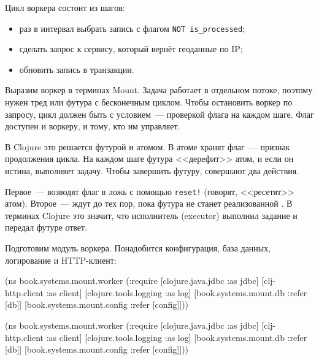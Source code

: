 
Цикл воркера состоит из шагов:

\begin{itemize}

\item
  раз в интервал выбрать запись с флагом \verb|NOT is_processed|;

\item
  сделать запрос к сервису, который вернёт геоданные по IP;

\item
  обновить запись в транзакции.

\end{itemize}

Выразим воркер в терминах Mount. Задача работает в отдельном потоке, поэтому
нужен тред или футура с бесконечным циклом. Чтобы остановить воркер по запросу,
цикл должен быть с условием~--- проверкой флага на каждом шаге. Флаг доступен и
воркеру, и тому, кто им управляет.


В Clojure это решается футурой и атомом. В атоме хранят флаг~--- признак
продолжения цикла. На каждом шаге футура <<дерефит>> атом, и если он истина,
выполняет задачу. Чтобы завершить футуру, совершают два действия.

Первое~--- возводят флаг в ложь с помощью \verb|reset!| (говорят, <<ресетят>>
атом). Второе~--- ждут до тех пор, пока футура не станет реализованной
. В терминах Clojure это значит, что исполнитель (executor)
выполнил задание и передал футуре ответ.

Подготовим модуль воркера. Понадобится конфигурация, база данных, логирование и
HTTP-клиент:

\ifnarrow

\begin{english}
  \begin{clojure}
(ns book.systems.mount.worker
  (:require
   [clojure.java.jdbc :as jdbc]
   [clj-http.client :as client]
   [clojure.tools.logging :as log]
   [book.systems.mount.db :refer [db]]
   [book.systems.mount.config
     :refer [config]]))
  \end{clojure}
\end{english}

\else

\begin{english}
  \begin{clojure}
(ns book.systems.mount.worker
  (:require
   [clojure.java.jdbc :as jdbc]
   [clj-http.client :as client]
   [clojure.tools.logging :as log]
   [book.systems.mount.db :refer [db]]
   [book.systems.mount.config :refer [config]]))
  \end{clojure}
\end{english}

